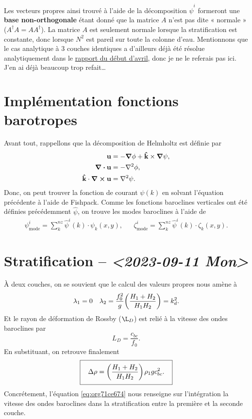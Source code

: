 \documentclass[10pt]{report}
\numberwithin{equation}{section}
\newcommand{\kvf}{\vb{\hat{k}}}
\newcommand{\uu}{\vb{u}}
\newcommand{\venti}{\vphantom{\sum_x^x}}
\newcommand{\pt}{\hspace{1pt}} %
\begin{document}
Les vecteurs propres ainsi trouvé à l'aide de la décomposition \(\hat{\psi}^i\) formeront une \textbf{base non-orthogonale} étant donné que la matrice \(A\) n'est pas dite « normale » (\(A^\dagger A = A A^\dagger\)).
La matrice \(A\) est seulement normale lorsque la stratification est constante, donc lorsque
\(N^2\) est pareil sur toute la colonne d'eau.
Mentionnons que le cas analytique à 3 couches identiques a d'ailleurs déjà été résolue analytiquement dans le \href{rapport-2023-04-07.pdf}{rapport du début d'avril}, donc je ne le referais pas ici.
J'en ai déjà beaucoup trop refait\ldots{}

\section{Implémentation fonctions barotropes}
\label{sec:org4801102}
Avant tout, rappellons que la décomposition de Helmholtz est définie par
\begin{subequations}
\begin{align}
   \uu &= -\gradient{\phi} + \kvf \times \gradient{\psi},\\
   \divergence{\uu} &= -\laplacian{\phi},\\
   \kvf\cdot\curl{\uu} &= \laplacian{\psi}.
\end{align}
\end{subequations}
Donc, on peut trouver la fonction de courant \(\psi(k)\) en solvant l'équation précédente à l'aide de Fishpack.
Comme les fonctions baroclines verticales ont été définies précédemment \(\hat{\psi}\), on trouve les modes baroclines à l'aide de
\begin{align}
   &&\psi_\text{mode}^i = \sum_k^{nz} \hat{\psi}^i(k)\cdot  \psi_k(x,y),
   &&\zeta_\text{mode}^i = \sum_k^{nz} \hat{\psi}^i(k)\cdot  \zeta_k(x,y).&&
\end{align}



\section{Stratification -- \textit{<2023-09-11 Mon>}}
\label{sec:org1cf744c}
À deux couches, on se souvient que le calcul des valeurs propres nous amène à
\begin{align}
   && \lambda_1 = 0 && \lambda_2 = \frac{f_0^2}{g} \qty(\frac{H_1+H_2}{H_1 H_2}) = k_d^2. &&
\end{align}
Et le rayon de déformation de Rossby (\(\L_D\)) est relié à la vitesse des ondes baroclines par
\begin{equation}
   L_D = \frac{c_{bc}}{f_0}.
\end{equation}
En substituant, on retrouve finalement
\begin{equation}
\label{eq:org71ce674}
   \boxed{\hspace{0.3cm}\Delta\rho = \qty(\frac{H_1+H_2}{H_1H_2})\pt\rho_1 g c_{bc}^2.\venti\hspace{0.3cm}}
\end{equation}
Concrétement, l'équation \ref{eq:org71ce674} nous renseigne sur l'intégration la vitesse des ondes baroclines dans la stratification entre la première et la seconde couche.
\end{document}
